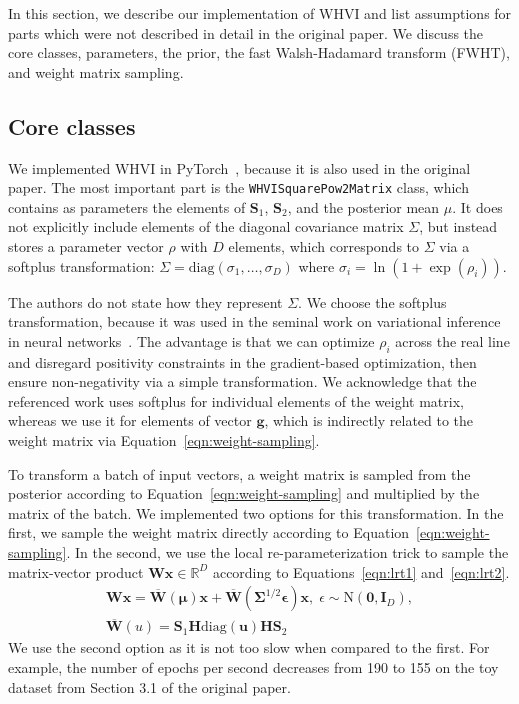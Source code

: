 In this section, we describe our implementation of WHVI and list assumptions for parts which were not described in detail in the original paper.
We discuss the core classes, parameters, the prior, the fast Walsh-Hadamard transform (FWHT), and weight matrix sampling.
\subsection{Core classes}\label{subsec:core-classes}
We implemented WHVI in PyTorch~\cite{pytorch}, because it is also used in the original paper.
The most important part is the \texttt{WHVISquarePow2Matrix} class, which contains as parameters the elements of $\mathbf{S}_1$, $\mathbf{S}_2$, and the posterior mean $\mu$.
It does not explicitly include elements of the diagonal covariance matrix $\Sigma$, but instead stores a parameter vector $\rho$ with $D$ elements, which corresponds to $\Sigma$ via a softplus transformation: $\Sigma = \mathrm{diag}(\sigma_1, \dots, \sigma_D)$ where $\sigma_i = \ln(1 + \exp(\rho_i))$.

The authors do not state how they represent $\Sigma$.
We choose the softplus transformation, because it was used in the seminal work on variational inference in neural networks~\cite{blundell2015weight}.
The advantage is that we can optimize $\rho_i$ across the real line and disregard positivity constraints in the gradient-based optimization, then ensure non-negativity via a simple transformation.
We acknowledge that the referenced work uses softplus for individual elements of the weight matrix, whereas we use it for elements of vector $\mathbf{g}$, which is indirectly related to the weight matrix via Equation~\ref{eqn:weight-sampling}.

To transform a batch of input vectors, a weight matrix is sampled from the posterior according to Equation~\ref{eqn:weight-sampling} and multiplied by the matrix of the batch.
We implemented two options for this transformation.
In the first, we sample the weight matrix directly according to Equation~\ref{eqn:weight-sampling}.
In the second, we use the local re-parameterization trick to sample the matrix-vector product $\mathbf{W}\mathbf{x} \in \mathbb{R}^D$ according to Equations~\ref{eqn:lrt1} and~\ref{eqn:lrt2}.
\begin{align}
    \mathbf{W}\mathbf{x} = \overline{\mathbf{W}}(\mathbf{\mu})\mathbf{x} + \overline{\mathbf{W}}(\mathbf{\Sigma}^{1/2}\mathbf{\epsilon})\mathbf{x}, \; \epsilon \sim \mathrm{N}(\mathbf{0}, \mathbf{I}_D)\label{eqn:lrt1},\\
    \overline{\mathbf{W}}(u) = \mathbf{S}_1 \mathbf{H} \mathrm{diag}(\mathbf{u}) \mathbf{H} \mathbf{S}_2\label{eqn:lrt2}
\end{align}
We use the second option as it is not too slow when compared to the first.
For example, the number of epochs per second decreases from 190 to 155 on the toy dataset from Section 3.1 of the original paper.

